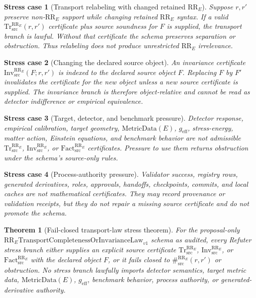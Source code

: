 \documentclass[11pt]{article}
\newcommand{\RRE}{\mathrm{RR}_{E}}
\newcommand{\TrRR}{\mathrm{Tr}^{\RRE}_{\mathrm{src}}}
\newcommand{\InvRR}{\mathrm{Inv}^{\RRE}_{\mathrm{src}}}
\newcommand{\FactRR}{\mathrm{Fact}^{\RRE}_{\mathrm{src}}}
\newcommand{\SepRR}{\#^{\RRE}_{\mathrm{src}}}
\newcommand{\LawRR}{\mathrm{RR}_{E}\mathrm{TransportCompletenessOrInvarianceLaw}_{v1}}
\newcommand{\MetricData}{\mathrm{MetricData}}
\newcommand{\geff}{g_{\mathrm{eff}}}
\newtheorem{stresscase}{Stress case}
\newtheorem{theorem}{Theorem}
\begin{document}
\begin{stresscase}[Transport relabeling with changed retained \(\RRE\)]
Suppose \(r,r'\) preserve non-\(\RRE\) support while changing retained
\(\RRE\) syntax. If a valid \(\TrRR(r,r')\) certificate plus source soundness
for \(F\) is supplied, the transport branch is lawful. Without that certificate
the schema preserves separation or obstruction. Thus relabeling does not
produce unrestricted \(\RRE\) irrelevance.
\end{stresscase}

\begin{stresscase}[Changing the declared source object]
An invariance certificate \(\InvRR(F;r,r')\) is indexed to the declared
source object \(F\). Replacing \(F\) by \(F'\) invalidates the certificate for
the new object unless a new source certificate is supplied. The invariance
branch is therefore object-relative and cannot be read as detector
indifference or empirical equivalence.
\end{stresscase}

\begin{stresscase}[Target, detector, and benchmark pressure]
Detector response, empirical calibration, target geometry, \(\MetricData(E)\),
\(\geff\), stress-energy, matter action, Einstein equations, and benchmark
behavior are not admissible \(\TrRR\), \(\InvRR\), or \(\FactRR\)
certificates. Pressure to use them returns obstruction under the schema's
source-only rules.
\end{stresscase}

\begin{stresscase}[Process-authority pressure]
Validator success, registry rows, generated derivatives, roles, approvals,
handoffs, checkpoints, commits, and local caches are not mathematical
certificates. They may record provenance or validation receipts, but they do
not repair a missing source certificate and do not promote the schema.
\end{stresscase}

\begin{theorem}[Fail-closed transport-law stress theorem]
For the proposal-only \(\LawRR\) schema as audited, every Refuter stress
branch either supplies an explicit source certificate \(\TrRR\),
\(\InvRR\), or \(\FactRR\) with the declared object \(F\), or it fails closed
to \(\SepRR(r,r')\) or obstruction. No stress branch lawfully imports detector
semantics, target metric data, \(\MetricData(E)\), \(\geff\), benchmark
behavior, process authority, or generated-derivative authority.
\end{theorem}
\end{document}

